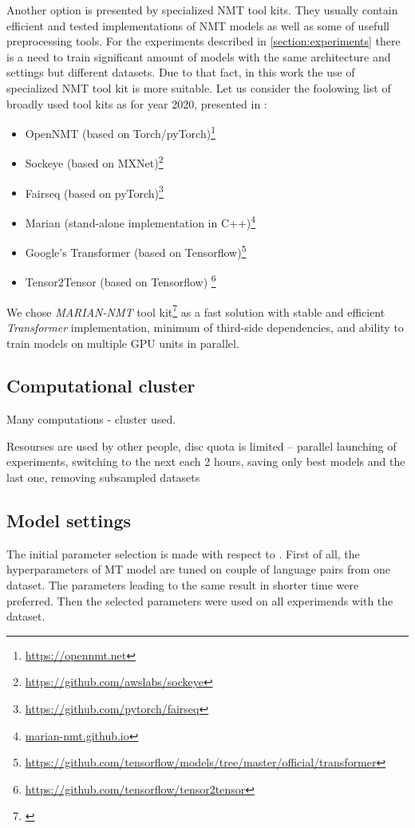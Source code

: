 Another option is presented by specialized NMT tool kits.
They usually contain efficient and tested implementations of NMT models as well as some of
usefull preprocessing tools.
For the experiments described in \ref{section:experiments} there is a need to train significant
amount of models with the same architecture and settings but different datasets.
Due to that fact, in this work the use of specialized NMT tool kit is more suitable.
Let us consider the foolowing list of broadly used tool kits as for year 2020,
presented in \cite{koehn_2020}:

\begin{itemize}
  \item OpenNMT (based on Torch/pyTorch)\footnote{\url{https://opennmt.net}}
  \item Sockeye (based on MXNet)\footnote{\url{https://github.com/awslabs/sockeye}}
  \item Fairseq (based on pyTorch)\footnote{\url{https://github.com/pytorch/fairseq}}
  \item Marian (stand-alone implementation in C++)\footnote{\url{marian-nmt.github.io}}
  \item Google's Transformer (based on Tensorflow)\footnote{\url{
    https://github.com/tensorflow/models/tree/master/official/transformer}}
  \item Tensor2Tensor (based on Tensorflow) \footnote{\url{
    https://github.com/tensorflow/tensor2tensor}}
\end{itemize}

We chose \textit{MARIAN-NMT} tool kit\footnote{\cite{mariannmt}} as a fast solution
with stable and efficient \textit{Transformer} \cite{vaswani-2017-transformer} implementation,
minimum of third-side dependencies, and ability to train models on multiple GPU units in parallel.


\subsection{Computational cluster}

Many computations - cluster used.

Resourses are used by other people, disc quota is limited -- 
parallel launching of experiments, 
switching to the next each 2 hours, 
saving only best models and the last one,
removing subsampled datasets

\subsection{Model settings}

The initial parameter selection is made with respect to \cite{training-tips}.
First of all, the hyperparameters of MT model are tuned
on couple of language pairs from one dataset.
The parameters leading to the same result in shorter time were preferred.
Then the selected parameters were used on all experimends with the dataset.
